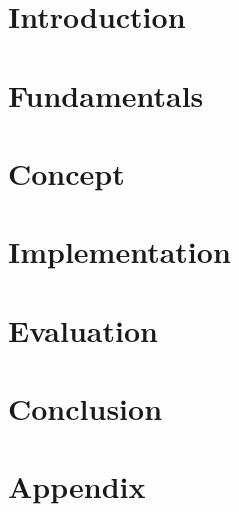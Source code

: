 \documentclass[10pt,twoside]{report}
\title{\thesisTitle}
\author{\thesisAuthor}
\date{\today}
\begin{document}




\chapter*{}



\tableofcontents{}

\chapter{Introduction}
\label{chapter:introduction}


\chapter{Fundamentals}
\label{chapter:fundamentals}


\chapter{Concept}
\label{chapter:concept}


\chapter{Implementation}
\label{chapter:implementation}


\chapter{Evaluation}
\label{chapter:testing_and_evaluation}


\chapter{Conclusion}
\label{chapter:conclussion}


\newpage
\listoffigures{}

\lstlistoflistings

\printglossaries


\nocite{*}
\printbibliography{}

\newpage
\appendix{}
\chapter{Appendix}

\end{document}
